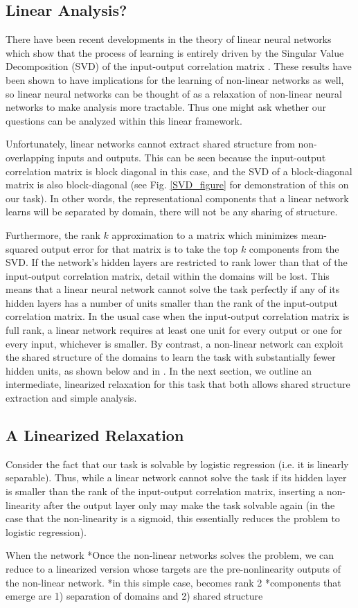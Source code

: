 \documentclass[10pt,letterpaper]{article}
\begin{document}
\subsection{Linear Analysis?}
There have been recent developments in the theory of linear neural networks which show that the process of learning is entirely driven by the Singular Value Decomposition (SVD) of the input-output correlation matrix \cite{Saxe2013}. These results have been shown to have implications for the learning of non-linear networks as well, so linear neural networks can be thought of as a relaxation of non-linear neural networks to make analysis more tractable. Thus one might ask whether our questions can be analyzed within this linear framework. \par
Unfortunately, linear networks cannot extract shared structure from non-overlapping inputs and outputs. This can be seen because the input-output correlation matrix is block diagonal in this case, and the SVD of a block-diagonal matrix is also block-diagonal (see Fig. \ref{SVD_figure} for demonstration of this on our task). In other words, the representational components that a linear network learns will be separated by domain, there will not be any sharing of structure.\par 
Furthermore, the rank $k$ approximation to a matrix which minimizes mean-squared output error for that matrix is to take the top $k$ components from the SVD. If the network's hidden layers are restricted to rank lower than that of the input-output correlation matrix, detail within the domains will be lost. This means that a linear neural network cannot solve the task perfectly if any of its hidden layers has a number of units smaller than the rank of the input-output correlation matrix. In the usual case when the input-output correlation matrix is full rank, a linear network requires at least one unit for every output or one for every input, whichever is smaller. By contrast, a non-linear network can exploit the shared structure of the domains to learn the task with substantially fewer hidden units, as shown below and in \cite{Hinton1986}. In the next section, we outline an intermediate, linearized relaxation for this task that both allows shared structure extraction and simple analysis. 
\subsection{A Linearized Relaxation}
Consider the fact that our task is solvable by logistic regression (i.e. it is linearly separable). Thus, while a linear network cannot solve the task if its hidden layer is smaller than the rank of the input-output correlation matrix, inserting a non-linearity after the output layer only may make the task solvable again (in the case that the non-linearity is a sigmoid, this essentially reduces the problem to logistic regression). \par
When the network  
*Once the non-linear networks solves the problem, we can reduce to a linearized version whose targets are the pre-nonlinearity outputs of the non-linear network.
*in this simple case, becomes rank 2
    *components that emerge are 1) separation of domains and 2) shared structure 
\end{document}
